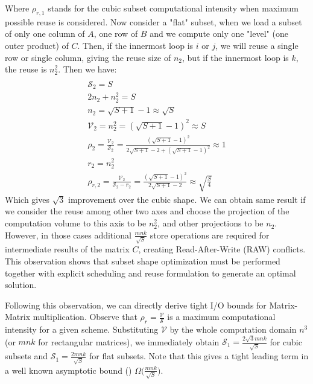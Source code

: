 \documentclass[sigconf]{acmart}
\begin{document}
Where $\rho_{r,1}$ stands for the cubic subset computational intensity 
when maximum 
possible reuse is considered. Now consider a "flat" subset, when we load 
a subset of only one column of $A$, one row of $B$ and we compute only one 
"level" (one outer product) of $C$. Then, if the innermost loop is $i$ or 
$j$, we will reuse a single row or single column, giving the reuse size of 
$n_2$, but if the innermost loop is $k$, the reuse is $n_2^2$. Then we 
have: 	
\begin{multline}
\label{eq:flat}
\\
\mathcal{S}_2 = S \\
2n_2 + n_2^2 = S \\
n_2 = \sqrt{S + 1} - 1 \approx \sqrt{S} \\
\mathcal{V}_2 = n_2^2 = (\sqrt{S + 1} - 1)^2  \approx S\\
\rho_2 = \frac{\mathcal{V}_2}{\mathcal{S}_2} = \frac{(\sqrt{S + 1} - 
	1)^2}{2\sqrt{S+1} - 2 + (\sqrt{S + 1} - 1)^2} \approx 1\\
r_2 = n_2^2 \\
\rho_{r,2} = \frac{\mathcal{V}_2}{\mathcal{S}_2 - r_2} = \frac{(\sqrt{S + 
		1} - 
	1)^2}{2\sqrt{S+1} - 2} \approx \sqrt{\frac{S}{4}} 
\end{multline}	
Which gives $\sqrt{3}$ improvement over the cubic shape. We can obtain same 
result if we consider the reuse among other two axes and choose the 
projection of the computation volume to this axis to be $n_2^2$, and other 
projections to be $n_2$. However, in those cases additional 
$\frac{mnk}{\sqrt{S}}$ 
store operations are required for intermediate results of the matrix $C$, 
creating Read-After-Write (RAW) conflicts. This 
observation shows that subset shape 
optimization must be performed together with explicit scheduling and reuse 
formulation to generate an optimal solution.

Following this observation, we can directly derive tight I/O bounds for 
Matrix-Matrix multiplication. Observe that $\rho_r = 
\frac{\mathcal{V}}{\mathcal{S}}$ is a maximum computational intensity for a 
given scheme. Substituting $\mathcal{V}$ by the whole computation domain $n^3$ 
(or $mnk$ for rectangular matrices), we immediately obtain $\mathcal{S}_1 = 
\frac{2\sqrt{3}mnk}{\sqrt{S}}$ for cubic subsets and $\mathcal{S}_1 = 
\frac{2mnk}{\sqrt{S}}$ for flat subsets. Note that this gives a tight 
leading term in a well known asymptotic bound (\cite{redblue}) 
$\Omega\big(\frac{mnk}{\sqrt{S}}\big)$.
\end{document}
